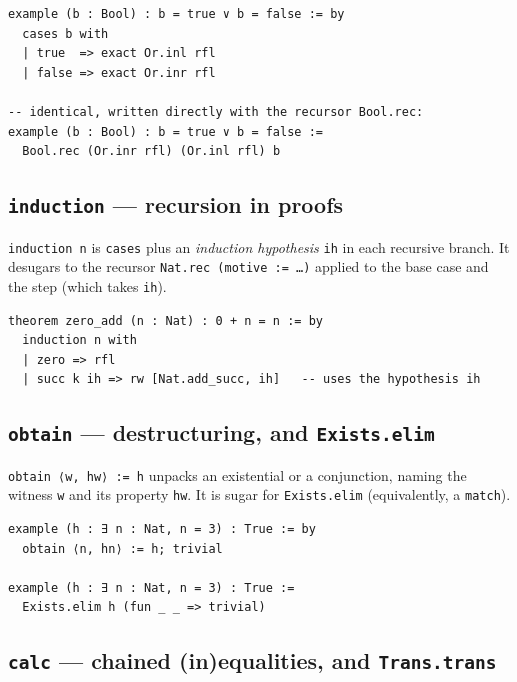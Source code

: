 \documentclass[11pt, a4paper, oneside]{book}
\newcommand{\lc}[1]{\texttt{#1}}
\begin{document}
\begin{leanbox}
\begin{verbatim}
example (b : Bool) : b = true ∨ b = false := by
  cases b with
  | true  => exact Or.inl rfl
  | false => exact Or.inr rfl

-- identical, written directly with the recursor Bool.rec:
example (b : Bool) : b = true ∨ b = false :=
  Bool.rec (Or.inr rfl) (Or.inl rfl) b
\end{verbatim}
\end{leanbox}

\subsection*{\lc{induction} --- recursion in proofs}

\lc{induction n} is \lc{cases} plus an \emph{induction hypothesis} \lc{ih} in
each recursive branch. It desugars to the recursor \lc{Nat.rec (motive := …)}
applied to the base case and the step (which takes \lc{ih}).

\begin{leanbox}
\begin{verbatim}
theorem zero_add (n : Nat) : 0 + n = n := by
  induction n with
  | zero => rfl
  | succ k ih => rw [Nat.add_succ, ih]   -- uses the hypothesis ih
\end{verbatim}
\end{leanbox}

\subsection*{\lc{obtain} --- destructuring, and \lc{Exists.elim}}

\lc{obtain ⟨w, hw⟩ := h} unpacks an existential or a conjunction, naming the
witness \lc{w} and its property \lc{hw}. It is sugar for \lc{Exists.elim}
(equivalently, a \lc{match}).

\begin{leanbox}
\begin{verbatim}
example (h : ∃ n : Nat, n = 3) : True := by
  obtain ⟨n, hn⟩ := h; trivial

example (h : ∃ n : Nat, n = 3) : True :=
  Exists.elim h (fun _ _ => trivial)
\end{verbatim}
\end{leanbox}

\subsection*{\lc{calc} --- chained (in)equalities, and \lc{Trans.trans}}
\end{document}
